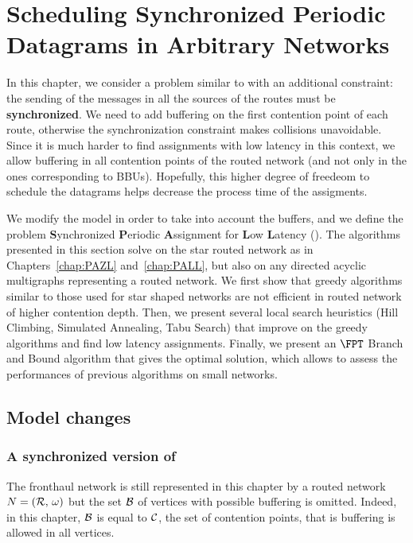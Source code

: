 
\chapter{Scheduling Synchronized Periodic Datagrams in Arbitrary Networks }
\label{chap:SPALL}
\minitoc

In this chapter, we consider a problem similar to \pall with an additional constraint: the sending of the messages in all the sources of the routes must be \textbf{synchronized}. We need to add buffering on the first contention point of each route, otherwise the synchronization constraint makes collisions unavoidable. Since it is much harder to find assignments with low latency in this context, we allow buffering in all contention points of the routed network (and not only in the ones corresponding to BBUs). Hopefully, this higher degree of freedeom to schedule the datagrams helps decrease the process time of the assigments.

We modify the model in order to take into account the buffers, and we define the problem \textbf{S}ynchronized \textbf{P}eriodic \textbf{A}ssignment for \textbf{L}ow \textbf{L}atency (\spall). The algorithms presented in this section solve \spall on the star routed network as in Chapters~\ref{chap:PAZL} and~\ref{chap:PALL}, but also on any directed acyclic multigraphs representing a routed network. We first show that greedy algorithms similar to those used for star shaped networks are not efficient in routed network of higher contention depth. Then, we present several local search heuristics (Hill Climbing, Simulated Annealing, Tabu Search) that improve on the greedy algorithms and find low latency assignments. Finally, we present an $\FPT$ Branch and Bound algorithm that gives the optimal solution, which allows to assess the performances of previous algorithms on small networks.


\section{Model changes}
\subsection{A synchronized version of \pall}

The fronthaul network is still represented in this chapter by a routed network $N = ({\cal R},\,\omega)$ but the set ${\cal B}$ of vertices with possible buffering is omitted. Indeed, in this chapter, ${\cal B}$ is equal to ${\cal C}$, the set of contention points, that is buffering is allowed in all vertices. 


